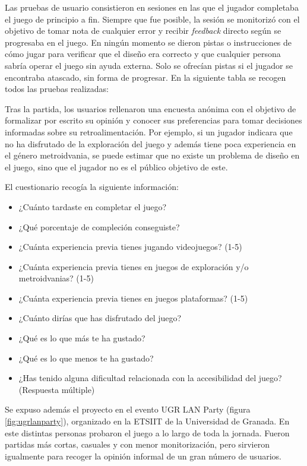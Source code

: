 Las pruebas de usuario consistieron en sesiones en las que el jugador completaba el juego de principio a fin. Siempre que fue posible, la sesión se monitorizó con el objetivo de tomar nota de cualquier error y recibir \textit{feedback} directo según se progresaba en el juego. En ningún momento se dieron pistas o instrucciones de cómo jugar para verificar que el diseño era correcto y que cualquier persona sabría operar el juego sin ayuda externa. Solo se ofrecían pistas si el jugador se encontraba atascado, sin forma de progresar. En la siguiente tabla se recogen todos las pruebas realizadas:


Tras la partida, los usuarios rellenaron una encuesta anónima con el objetivo de formalizar por escrito su opinión y conocer sus preferencias para tomar decisiones informadas sobre su retroalimentación. Por ejemplo, si un jugador indicara que no ha disfrutado de la exploración del juego y además tiene poca experiencia en el género metroidvania, se puede estimar que no existe un problema de diseño en el juego, sino que el jugador no es el público objetivo de este.

El cuestionario recogía la siguiente información:

\begin{itemize}
    \item ¿Cuánto tardaste en completar el juego?
    \item ¿Qué porcentaje de compleción conseguiste?
    \item ¿Cuánta experiencia previa tienes jugando videojuegos? (1-5)
    \item ¿Cuánta experiencia previa tienes en juegos de exploración y/o metroidvanias? (1-5)
    \item ¿Cuánta experiencia previa tienes en juegos plataformas? (1-5)
    \item ¿Cuánto dirías que has disfrutado del juego?
    \item ¿Qué es lo que más te ha gustado?
    \item ¿Qué es lo que menos te ha gustado?
    \item ¿Has tenido alguna dificultad relacionada con la accesibilidad del juego? (Respuesta múltiple)
\end{itemize}

Se expuso además el proyecto en el evento UGR LAN Party (figura \ref{fig:ugrlanparty}), organizado en la ETSIIT de la Universidad de Granada. En este distintas personas probaron el juego a lo largo de toda la jornada. Fueron partidas más cortas, casuales y con menor monitorización, pero sirvieron igualmente para recoger la opinión informal de un gran número de usuarios.

